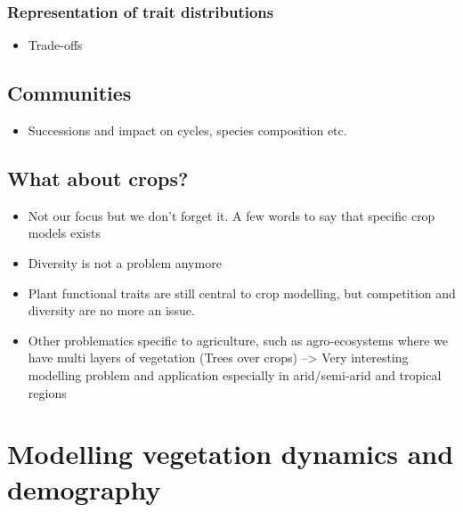 \documentclass[
  oneside]{book}
\providecommand{\tightlist}{%
  \setlength{\itemsep}{0pt}\setlength{\parskip}{0pt}}
\begin{document}
\hypertarget{representation-of-trait-distributions}{%
\subsection{Representation of trait distributions}\label{representation-of-trait-distributions}}

\begin{itemize}
\tightlist
\item
  Trade-offs
\end{itemize}

\hypertarget{communities}{%
\section{Communities}\label{communities}}

\begin{itemize}
\tightlist
\item
  Successions and impact on cycles, species composition etc.
\end{itemize}

\hypertarget{what-about-crops}{%
\section{What about crops?}\label{what-about-crops}}

\begin{itemize}
\tightlist
\item
  Not our focus but we don't forget it. A few words to say that specific crop models exists
\item
  Diversity is not a problem anymore
\item
  Plant functional traits are still central to crop modelling, but competition and diversity are no more an issue.
\item
  Other problematics specific to agriculture, such as agro-ecosystems where we have multi layers of vegetation (Trees over crops) --\textgreater{} Very interesting modelling problem and application especially in arid/semi-arid and tropical regions
\end{itemize}

\hypertarget{modelling-vegetation-dynamics-and-demography}{%
\chapter{Modelling vegetation dynamics and demography}\label{modelling-vegetation-dynamics-and-demography}}
\end{document}
